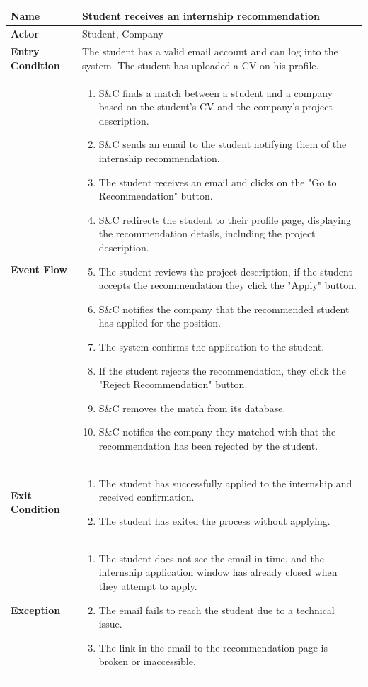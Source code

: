 \begin{longtable}{|p{}|p{}|}
\hline
\textbf{Name} &  Student receives an internship recommendation\\
\hline
\textbf{Actor} &  Student, Company\\
\hline
\textbf{Entry Condition} &  The student has a valid email account and can log into the system. The student has uploaded a CV on his profile.\\
\hline
\textbf{Event Flow} &  
\begin{enumerate}
\item S\&C finds a match between a student and a company based on the student's CV and the company’s project description.
\item S\&C sends an email to the student notifying them of the internship recommendation.
\item The student receives an email and clicks on the "Go to Recommendation" button.
\item S\&C redirects the student to their profile page, displaying the recommendation details, including the project description.
\item The student reviews the project description, if the student accepts the recommendation they click the "Apply" button.
\item S\&C notifies the company that the recommended student has applied for the position.
\item The system confirms the application to the student.
\item If the student rejects the recommendation, they click the "Reject Recommendation" button.
\item S\&C removes the match from its database.
\item S\&C notifies the company they matched with that the recommendation has been rejected by the student. 
\end{enumerate}
\\
\hline
\textbf{Exit Condition} & 
\begin{enumerate}
    \item  The student has successfully applied to the internship and received confirmation.
    \item The student has exited the process without applying.
\end{enumerate}\\
\hline
\textbf{Exception} &  
    \begin{enumerate}
        \item  The student does not see the email in time, and the internship application window has already closed when they attempt to apply.
        \item  The email fails to reach the student due to a technical issue.
        \item  The link in the email to the recommendation page is broken or inaccessible.
    \end{enumerate}\\
\hline
\end{longtable}

